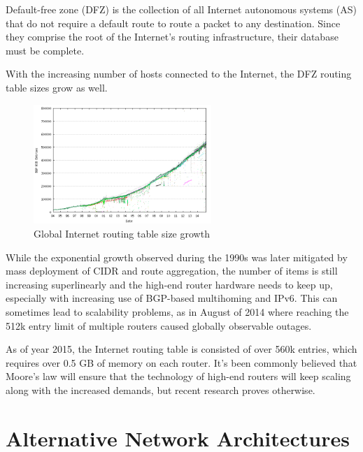         Default-free zone (DFZ) is the collection of all Internet autonomous systems (AS) that do not require a default route to route a packet to any destination. Since they comprise the root of the Internet's routing infrastructure, their database must be complete.

        With the increasing number of hosts connected to the Internet, the DFZ routing table sizes grow as well.

        \begin{figure}[H]
            \begin{center}
                \includegraphics[width=0.6\textwidth]{fig/problems_bgp-growth.png}
              \caption{Global Internet routing table size growth \cite{bgpgrow}}
              \label{fig:bgp-growth}
            \end{center}
        \end{figure}


        While the exponential growth observed during the 1990s was later mitigated by mass deployment of CIDR and route aggregation, the number of items is still increasing superlinearly and the high-end router hardware needs to keep up, especially with increasing use of BGP-based multihoming and IPv6. This can sometimes lead to scalability problems, as in August of 2014 where reaching the 512k entry limit of multiple routers caused globally observable outages.

        As of year 2015, the Internet routing table is consisted of over 560k entries, which requires over 0.5 GB of memory on each router. It's been commonly believed that Moore's law will ensure that the technology of high-end routers will keep scaling along with the increased demands, but recent research proves otherwise.


\chapter{Alternative Network Architectures}\label{archs}


